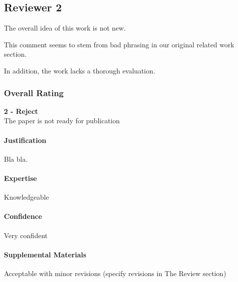 \subsection{Reviewer 2} \label{sec:rev:2}

The overall idea of this work is not new. 

\begin{response} \label{res:rev2:related}
This comment seems to stem from bad phrasing in our original related work section. 
\end{response}

In addition, the work lacks a thorough evaluation.

\subsubsection{Overall Rating}
\textbf{2 - Reject} \\
The paper is not ready for publication

\paragraph{Justification}
Bla bla.

\paragraph{Expertise}
Knowledgeable

\paragraph{Confidence}
Very confident

\paragraph{Supplemental Materials}
Acceptable with minor revisions (specify revisions in The Review section)
